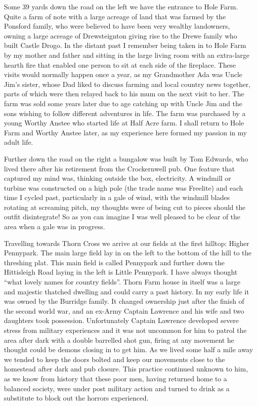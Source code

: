 Some 39 yards down the road on the left we have the entrance to Hole Farm. Quite
a farm of note with a large acreage of land that was farmed by the Ponsford
family, who were believed to have been very wealthy landowners, owning a large
acreage of Drewsteignton giving rise to the Drewe family who built Castle
Drogo. In the distant past I remember being taken in to Hole Farm by my mother
and father and sitting in the large living room with an extra-large hearth fire
that enabled one person to sit at each side of the fireplace. These visits
would normally happen once a year, as my Grandmother Ada was Uncle Jim's
sister, whose Dad liked to discuss farming and local country news together,
parts of which were then relayed back to his mum on the next visit to her. The
farm was sold some years later due to age catching up with Uncle Jim and the
sons wishing to follow different adventures in life. The farm was purchased by
a young Worthy Anstee who started life at Half Acre farm. I shall return to
Hole Farm and Worthy Anstee later, as my experience here formed my passion in
my adult life.

Further down the road on the right a bungalow was built by Tom Edwards, who
lived there after his retirement from the Crockernwell pub. One feature that
captured my mind was, thinking outside the box, electricity. A windmill or
turbine was constructed on a high pole (the trade name was Freelite) and each
time I cycled past, particularly in a gale of wind, with the windmill blades
rotating at screaming pitch, my thoughts were of being cut to pieces should the
outfit disintegrate! So as you can imagine I was well pleased to be clear of
the area when a gale was in progress.

Travelling towards Thorn Cross we arrive at our fields at the first hilltop:
Higher Pennypark. The main large field lay in on the left to the bottom of the
hill to the threshing plat. This main field is called Pennypark and further
down the Hittisleigh Road laying in the left is Little Pennypark. I have always
thought ``what lovely names for country fields''. Thorn Farm house in itself
was a large and majestic thatched dwelling and could carry a past history. In
my early life it was owned by the Burridge family. It changed ownership just
after the finish of the second world war, and an ex-Army Captain Lawrence and
his wife and two daughters took possession. Unfortunately Captain Lawrence
developed severe stress from military experiences and it was not uncommon for
him to patrol the area after dark with a double barrelled shot gun, firing at
any movement he thought could be demons closing in to get him. As we lived some
half a mile away we tended to keep the doors bolted and keep our movements
close to the homestead after dark and pub closure. This practice continued
unknown to him, as we know from history that these poor men, having returned
home to a balanced society, were under post military action and turned to drink
as a substitute to block out the horrors experienced.


